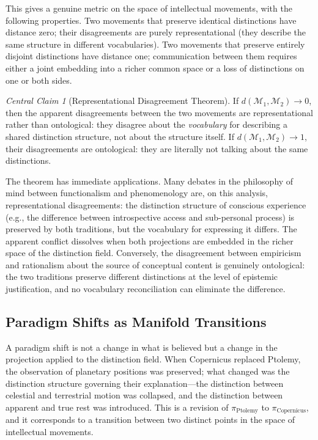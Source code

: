 \documentclass[12pt, letterpaper]{article}
\theoremstyle{remark}
\newtheorem*{claim}{Central Claim}
\begin{document}
This gives a genuine metric on the space of intellectual movements, with the
following properties.  Two movements that preserve identical distinctions have
distance zero; their disagreements are purely representational (they describe
the same structure in different vocabularies).  Two movements that preserve
entirely disjoint distinctions have distance one; communication between them
requires either a joint embedding into a richer common space or a loss of
distinctions on one or both sides.

\begin{claim}[Representational Disagreement Theorem]
If $d(\mathcal{M}_1, \mathcal{M}_2) \to 0$, then the apparent disagreements
between the two movements are representational rather than ontological:
they disagree about the \emph{vocabulary} for describing a shared distinction
structure, not about the structure itself.  If $d(\mathcal{M}_1,
\mathcal{M}_2) \to 1$, their disagreements are ontological: they are literally
not talking about the same distinctions.
\end{claim}

The theorem has immediate applications.  Many debates in the philosophy of
mind between functionalism and phenomenology are, on this analysis,
representational disagreements: the distinction structure of conscious
experience (e.g., the difference between introspective access and
sub-personal process) is preserved by both traditions, but the vocabulary for
expressing it differs.  The apparent conflict dissolves when both projections
are embedded in the richer space of the distinction field.  Conversely,
the disagreement between empiricism and rationalism about the source of
conceptual content is genuinely ontological: the two traditions preserve
different distinctions at the level of epistemic justification, and no
vocabulary reconciliation can eliminate the difference.

\subsection{Paradigm Shifts as Manifold Transitions}

A paradigm shift is not a change in what is believed but a change in the
projection applied to the distinction field.  When Copernicus replaced
Ptolemy, the observation of planetary positions was preserved; what changed
was the distinction structure governing their explanation---the distinction
between celestial and terrestrial motion was collapsed, and the distinction
between apparent and true rest was introduced.  This is a revision of
$\pi_{\text{Ptolemy}}$ to $\pi_{\text{Copernicus}}$, and it corresponds
to a transition between two distinct points in the space of intellectual
movements.
\end{document}
